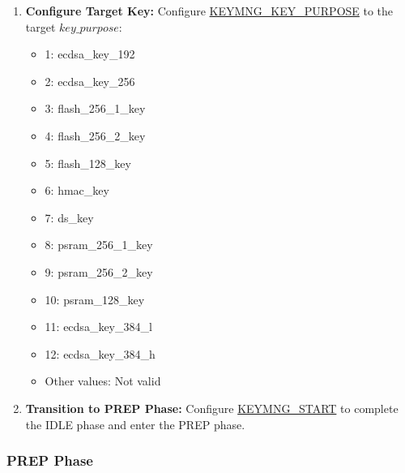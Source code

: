 \documentclass[main\_\_EN.tex]{subfiles}
\begin{document}
\begin{enumerate}
    \begin{itemize}
        \item 0: Random Deploy Mode
        \item 1: AES Deploy Mode
        \item 2: ECDH0 Deploy Mode
        \item 3: ECDH1 Deploy Mode
        \item 4: Private Key Recovery mode
        \item 5: \hyperref[para:keyinfo]{\begin{math}key\_info\end{math}} Export Mode
        \item Others: Not valid
    \end{itemize}
    \label{sec:keymng-key-purpose}
    \item \textbf{Configure Target Key:} Configure \hyperref[fielddesc:KEYMNGKEYPURPOSE]{KEYMNG\_KEY\_PURPOSE} to the target \begin{math}key\_purpose\end{math}:
    \begin{itemize}
        \item 1: ecdsa\_key\_192
        \item 2: ecdsa\_key\_256
        \item 3: flash\_256\_1\_key
        \item 4: flash\_256\_2\_key
        \item 5: flash\_128\_key
        \item 6: hmac\_key
        \item 7: ds\_key
        \item 8: psram\_256\_1\_key
        \item 9: psram\_256\_2\_key
        \item 10: psram\_128\_key
        \item 11: ecdsa\_key\_384\_l
        \item 12: ecdsa\_key\_384\_h
        \item Other values: Not valid
    \end{itemize}
    \item \textbf{Transition to PREP Phase:} Configure \hyperref[fielddesc:KEYMNGSTART]{KEYMNG\_START} to complete the IDLE phase and enter the PREP phase.
\end{enumerate}


\subsubsection{PREP Phase}
\end{document}
